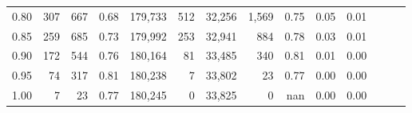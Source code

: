 \begin{tabular}{rrrrrrrrrrrrrr}
0.80 &     307 &    667 &  0.68 &  179,733 &      512 &  32,256 &   1,569 &  0.75 &  0.05 &      0.01 \\
0.85 &     259 &    685 &  0.73 &  179,992 &      253 &  32,941 &     884 &  0.78 &  0.03 &      0.01 \\
0.90 &     172 &    544 &  0.76 &  180,164 &       81 &  33,485 &     340 &  0.81 &  0.01 &      0.00 \\
0.95 &      74 &    317 &  0.81 &  180,238 &        7 &  33,802 &      23 &  0.77 &  0.00 &      0.00 \\
1.00 &       7 &     23 &  0.77 &  180,245 &        0 &  33,825 &       0 &   nan &  0.00 &      0.00 \\
\bottomrule
\end{tabular}

